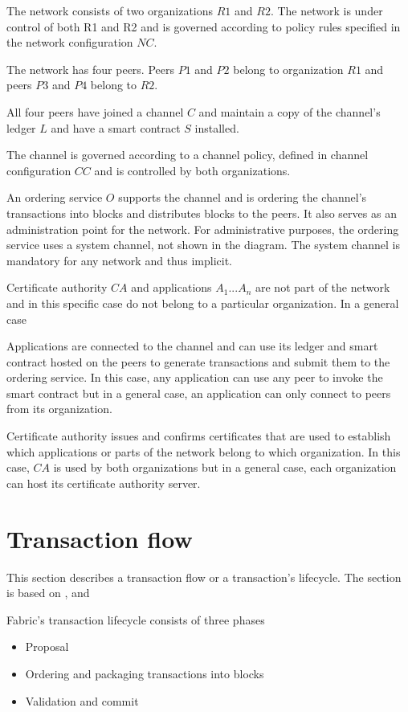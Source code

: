 The network consists of two organizations $R1$ and $R2$. The network is under control of both R1 and R2 and is governed according to policy rules specified in the network configuration $NC$.

The network has four peers. Peers $P1$ and $P2$ belong to organization $R1$ and peers $P3$ and $P4$ belong to $R2$.

All four peers have joined a channel $C$ and maintain a copy of the channel's ledger $L$ and have a smart contract $S$ installed.

The channel is governed according to a channel policy, defined in channel configuration $CC$ and is controlled by both organizations.

An ordering service $O$ supports the channel and is ordering the channel's transactions into blocks and distributes blocks to the peers. It also serves as an administration point for the network. For administrative purposes, the ordering service uses a system channel, not shown in the diagram. The system channel is mandatory for any network and thus implicit.

Certificate authority $CA$ and applications $A_{1} ... A_{n}$ are not part of the network and in this specific case do not belong to a particular organization. In a general case

Applications are connected to the channel and can use its ledger and smart contract hosted on the peers to generate transactions and submit them to the ordering service. In this case, any application can use any peer to invoke the smart contract but in a general case, an application can only connect to peers from its organization.

Certificate authority issues and confirms certificates that are used to establish which applications or parts of the network belong to which organization. In this case, $CA$ is used by both organizations but in a general case, each organization can host its certificate authority server.


\section{Transaction flow}
\label{sec:flow}
This section describes a transaction flow or a transaction's lifecycle. The section is based on \cite{fabricdocs:flow},  \cite{fabricdocs:peer} and \cite{fabricdocs:orderer}

Fabric's transaction lifecycle consists of three phases
\begin{itemize}
  \item Proposal
  \item Ordering and packaging transactions into blocks
  \item Validation and commit
\end{itemize}

